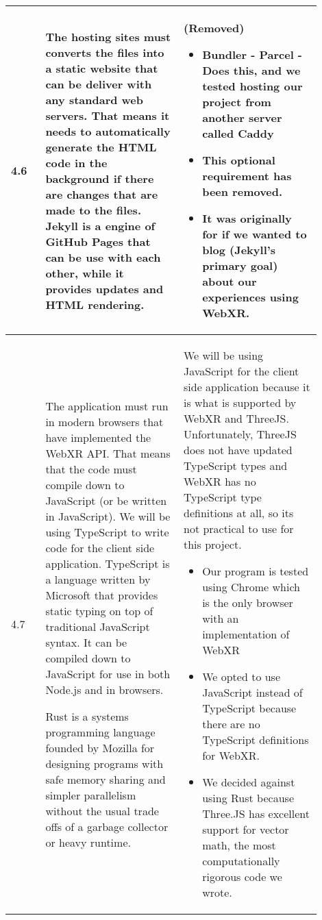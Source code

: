 \documentclass[onecolumn, draftclsnofoot,10pt, compsoc]{IEEEtran}
\begin{document}
\begin{longtable}{ |p{0.1\linewidth}|p{0.4\linewidth}|p{0.4\linewidth}| }
4.6 
&
The hosting sites must converts the files into a static website that can be deliver with any standard web servers. That means it needs to automatically generate the HTML code in the background if there are changes that are made to the files. Jekyll is a engine of GitHub Pages that can be use with each other, while it provides updates and HTML rendering.
&
(Removed)
\begin{itemize}
    \item Bundler - Parcel - Does this, and we tested hosting our project from another server called Caddy
    \item This optional requirement has been removed. 
    \item It was originally for if we wanted to blog (Jekyll's primary goal) about our experiences using WebXR.
\end{itemize} \\
\hline

4.7 
&
The application must run in modern browsers that have implemented the WebXR API. That means that the code must compile down to JavaScript (or be written in JavaScript). We will be using TypeScript to write code for the client side application. TypeScript is a language written by Microsoft that provides static typing on top of traditional JavaScript syntax. It can be compiled down to JavaScript for use in both Node.js and in browsers.

Rust is a systems programming language founded by Mozilla for designing programs with safe memory sharing and simpler parallelism without the usual trade offs of a garbage collector or heavy runtime.
& 
We will be using JavaScript for the client side application because it is what is supported by WebXR and ThreeJS. Unfortunately, ThreeJS does not have updated TypeScript types and WebXR has no TypeScript type definitions at all, so its not practical to use for this project.
\begin{itemize}
    \item Our program is tested using Chrome which is the only browser with an implementation of WebXR
    \item We opted to use JavaScript instead of TypeScript because there are no TypeScript definitions for WebXR. 
    \item We decided against using Rust because Three.JS has excellent support for vector math, the most computationally rigorous code we wrote. 
\end{itemize} \\
\hline


\end{longtable}
\end{document}
